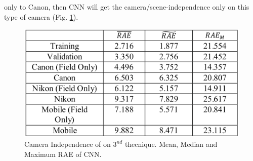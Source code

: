 \begin{enumerate}
    only to Canon, then CNN will get the camera/scene-independence 
    only on this type of camera (Fig. \ref{fig:CNNtec3}).
    \begin{figure}[h!]
        \centering
        \includegraphics[width = 0.6 \linewidth]{images/paper4/CNNtec3.png}
        \centering
        \caption{Camera Independence of \cite{0807099122} on $ 3^{nd} $ thecnique. Mean, Median and Maximum RAE of CNN.}
        \label{fig:CNNtec3}
    \end{figure}
\end{enumerate}

